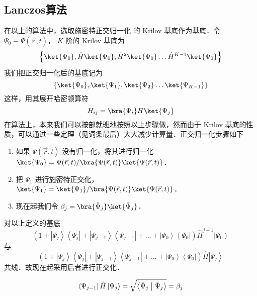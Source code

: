 \subsection{Lanczos算法}
在以上的算法中，选取施密特正交归一化 %
的 Krilov 基底作为基底．令 $\Psi_0 \equiv \Psi(\vec r, t)$，  $K$ 阶的 Krilov 基底为
 \begin{equation}
\left\{ \ket{\Psi_0}, \hat H \ket{\Psi_0}, \hat H^2 \ket{\Psi_0} \dots \hat H^{K-1} \ket{\Psi_0} \right\}
\end{equation}
我们把正交归一化后的基底记为
 \begin{equation}
\left\{ \ket{\Psi_0}, \ket{\Psi_1}, \ket{\Psi_2} \dots \ket{\Psi_{K-1}} \right\}
\end{equation}
这样，用其展开哈密顿算符
\begin{equation}
H_{ij}=\bra{\Psi_i} H \ket{\Psi_j}
\end{equation}
在算法上，本来我们可以按部就班地按照以上步骤做，然而由于 Krilov 基底的性质，可以通过一些定理（见词条最后）大大减少计算量．正交归一化步骤如下

\begin{enumerate}
\item 如果 $\Psi(\vec r,t)$ 没有归一化，将其进行归一化 $\ket{\Psi_0}=\Psi(\vec r,t)/\bra{\Psi(\vec r,t)}\ket{\Psi(\vec r,t)}$．
\item 把 $\Psi_1$ 进行施密特正交化， $\ket{\Psi_1}=\ket{\Psi_1}/\bra{\Psi(\vec r,t)}\ket{\Psi(\vec r,t)}$．  %
\item 现在起我们令 $\beta_j = \bra{\tilde\Psi_j}\ket{\tilde\Psi_j}$． %
\end{enumerate}

{\noindent {}}
对以上定义的基底
\begin{equation}
\left( {1 + \left| {\Psi_j} \right\rangle \left\langle {\Psi_j} \right| + \left| {\Psi_{j - 1}} \right\rangle \left\langle {\Psi_{j - 1}} \right| + ... + \left| {\Psi_0} \right\rangle \left\langle {\Psi_0} \right|} \right){\hat H^{j + 1}}\left| {\Psi_0} \right\rangle
\end{equation}
与
\begin{equation}
\left( {1 + \left| {\Psi_j} \right\rangle \left\langle {\Psi_j} \right| + \left| {\Psi_{j - 1}} \right\rangle \left\langle {\Psi_{j - 1}} \right| + ... + \left| {\Psi_0} \right\rangle \left\langle {\Psi_0} \right|} \right)\hat H\left| {\Psi_j} \right\rangle 
\end{equation}
共线．故现在起采用后者进行正交化．

{\noindent {}}
\begin{equation}
\left\langle {\Psi_{j - 1}} \right|\hat H\left| {\Psi_j} \right\rangle  = \sqrt {\left\langle {{\tilde \Psi }_j}
 \mathrel{\left | {\vphantom {{{\tilde \Psi }_j} {{\tilde \Psi }_j}}}
 \right. \kern-\nulldelimiterspace}
 {{\tilde \Psi }_j} \right\rangle }  = {\beta_j}
\end{equation}

